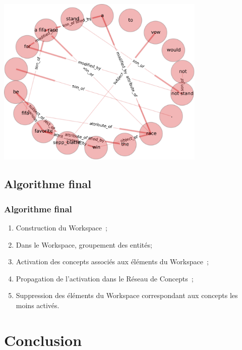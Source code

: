 \documentclass[12pt]{beamer}
\begin{document}
\begin{frame}
  \begin{center}
    \includegraphics[width=10cm]{./images/workspace.pdf}
  \end{center}
\end{frame}
\subsection{Algorithme final}

\begin{frame}
 \frametitle{Algorithme final}

 \begin{enumerate}[<+->]
  \item Construction du Workspace~;
  \item Dans le Workspace, groupement des entités;
  \item Activation des concepts associés aux éléments du Workspace~;
  \item Propagation de l'activation dans le Réseau de Concepts~;
  \item Suppression des éléments du Workspace correspondant aux concepts les moins activés.
 \end{enumerate}
 
\end{frame}

\section{Conclusion}
\end{document}
